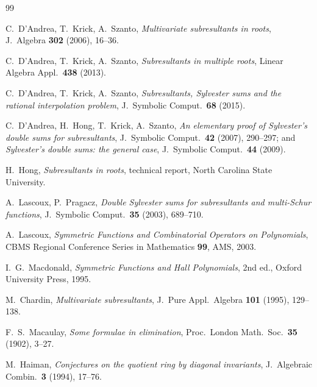 \documentclass[11pt,reqno]{amsart}
\theoremstyle{plain}
\theoremstyle{definition}
\begin{document}
\begin{thebibliography}{99}

 C.~D'Andrea, T.~Krick, A.~Szanto,
  \emph{Multivariate subresultants in roots},
  J.~Algebra \textbf{302} (2006), 16--36.

 C.~D'Andrea, T.~Krick, A.~Szanto,
  \emph{Subresultants in multiple roots},
  Linear Algebra Appl.\ \textbf{438} (2013).

 C.~D'Andrea, T.~Krick, A.~Szanto,
  \emph{Subresultants, Sylvester sums and the rational interpolation problem},
  J.~Symbolic Comput.\ \textbf{68} (2015).

 C.~D'Andrea, H.~Hong, T.~Krick, A.~Szanto,
  \emph{An elementary proof of Sylvester's double sums for subresultants},
  J.~Symbolic Comput.\ \textbf{42} (2007), 290--297; and
  \emph{Sylvester's double sums: the general case},
  J.~Symbolic Comput.\ \textbf{44} (2009).

 H.~Hong, \emph{Subresultants in roots}, technical report,
  North Carolina State University.

 A.~Lascoux, P.~Pragacz,
  \emph{Double Sylvester sums for subresultants and multi-Schur functions},
  J.~Symbolic Comput.\ \textbf{35} (2003), 689--710.

 A.~Lascoux,
  \emph{Symmetric Functions and Combinatorial Operators on Polynomials},
  CBMS Regional Conference Series in Mathematics \textbf{99}, AMS, 2003.

 I.~G.~Macdonald,
  \emph{Symmetric Functions and Hall Polynomials}, 2nd ed.,
  Oxford University Press, 1995.

 M.~Chardin, \emph{Multivariate subresultants},
  J.~Pure Appl.\ Algebra \textbf{101} (1995), 129--138.

 F.~S.~Macaulay, \emph{Some formulae in elimination},
  Proc.\ London Math.\ Soc.\ \textbf{35} (1902), 3--27.

 M.~Haiman,
  \emph{Conjectures on the quotient ring by diagonal invariants},
  J.~Algebraic Combin.\ \textbf{3} (1994), 17--76.

\end{thebibliography}
\end{document}
